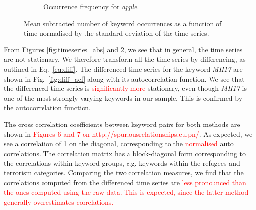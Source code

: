 \documentclass[12pt, a4paper]{article}
\begin{document}
\begin{figure}
\begin{subfigure}{.5\textwidth}
  \caption{Occurrence frequency for \textit{apple}.}
  \label{fig:sub23}
\end{subfigure}
\caption{Mean subtracted number of keyword occurrences as a function of time normalised by the standard deviation of the time series.}
\label{fig:timeseries_rel}
\end{figure}

From Figures \ref{fig:timeseries_abs} and \ref{fig:timeseries_rel}, we see that in general, the time series are not stationary. We therefore transform all the time series by differencing, as outlined in Eq.~\ref{eq:diff}. The differenced time series for the keyword \textit{MH17} are shown in Fig.~\ref{fig:diff_acf} along with its autocorrelation function. We see that the differenced time series is \textcolor{red}{significantly more} stationary, even though \textit{MH17} is one of the most strongly varying keywords in our sample. This is confirmed by the autocorrelation function.

The cross correlation coefficients between keyword pairs for both methods are shown in \textcolor{red}{Figures 6 and 7 on http://spuriousrelationships.eu.pn/}. As expected, we see a correlation of 1 on the diagonal, corresponding to the \textcolor{red}{normalised} auto correlations. The correlation matrix has a block-diagonal form corresponding to the correlations within keyword groups, e.g. keywords within the refugees and terrorism categories. Comparing the two correlation measures, we find that the correlations computed from the differenced time series are \textcolor{red}{less pronounced than the ones computed using the raw data. This is expected, since the latter method generally overestimates correlations.} 
\end{document}
